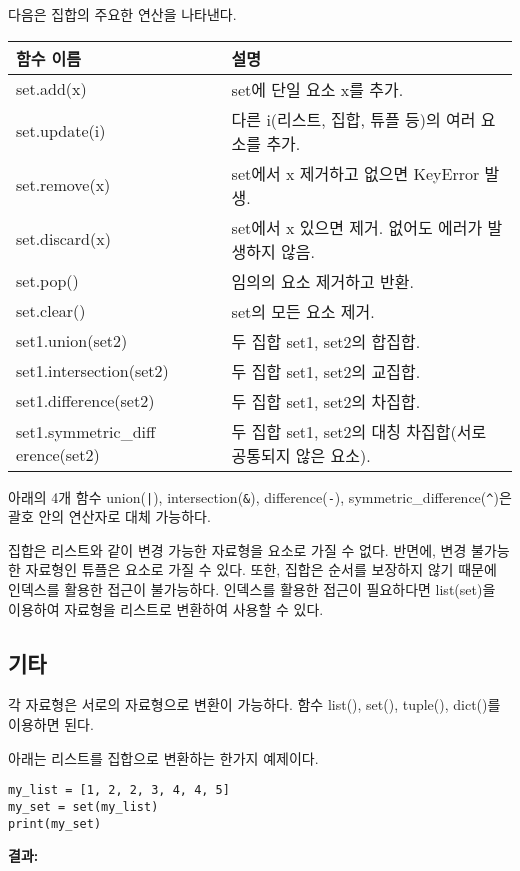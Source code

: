 다음은 집합의 주요한 연산을 나타낸다.

\begin{longtable}[]{@{}p{4cm} p{10cm}@{}}
    \toprule
    함수 이름 & 설명\\
    \midrule
    \endhead
    set.add(x) & set에 단일 요소 x를 추가. \\
    set.update(i) & 다른 i(리스트, 집합, 튜플 등)의 여러 요소를 추가. \\
    set.remove(x) & set에서 x 제거하고 없으면 KeyError 발생. \\
    set.discard(x) & set에서 x 있으면 제거. 없어도 에러가 발생하지 않음. \\
    set.pop() & 임의의 요소 제거하고 반환. \\
    set.clear() & set의 모든 요소 제거. \\
    set1.union(set2) & 두 집합 set1, set2의 합집합. \\
    set1.intersection(set2) & 두 집합 set1, set2의 교집합. \\
    set1.difference(set2) & 두 집합 set1, set2의 차집합. \\
    set1.symmetric\_diff\newline
    erence(set2) & 두 집합 set1, set2의 대칭 차집합(서로 공통되지 않은 요소). \\
    \bottomrule
\end{longtable}

아래의 4개 함수 union(\texttt{|}), intersection(\texttt{\&}), difference(\texttt{-}), symmetric\_difference(\texttt{\^})은 괄호 안의 연산자로 대체 가능하다.

집합은 리스트와 같이 변경 가능한 자료형을 요소로 가질 수 없다. 반면에, 변경 불가능한 자료형인 튜플은 요소로 가질 수 있다. 또한, 집합은 순서를 보장하지 않기 때문에 인덱스를 활용한 접근이 불가능하다. 인덱스를 활용한 접근이 필요하다면 list(set)을 이용하여 자료형을 리스트로 변환하여 사용할 수 있다.

\subsection{기타}
각 자료형은 서로의 자료형으로 변환이 가능하다. 함수 list(), set(), tuple(), dict()를 이용하면 된다.

아래는 리스트를 집합으로 변환하는 한가지 예제이다.

\begin{minipage}{\textwidth}
\begin{tcolorbox}[colframe=black, colback=white]
\begin{verbatim}
my_list = [1, 2, 2, 3, 4, 4, 5]
my_set = set(my_list)
print(my_set)
\end{verbatim}
\end{tcolorbox}
\textbf{결과: }
\end{minipage}

